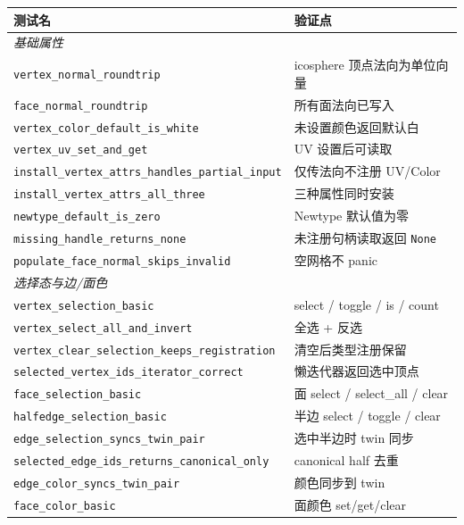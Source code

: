 \documentclass[11pt,a4paper]{article}
\begin{document}
\begin{longtable}{@{}ll@{}}
  \toprule
  \textbf{测试名} & \textbf{验证点} \\
  \midrule
  \endhead
  \multicolumn{2}{l}{\textit{基础属性}} \\
  \texttt{vertex\_normal\_roundtrip}        & icosphere 顶点法向为单位向量 \\
  \texttt{face\_normal\_roundtrip}          & 所有面法向已写入 \\
  \texttt{vertex\_color\_default\_is\_white} & 未设置颜色返回默认白 \\
  \texttt{vertex\_uv\_set\_and\_get}        & UV 设置后可读取 \\
  \texttt{install\_vertex\_attrs\_handles\_partial\_input} & 仅传法向不注册 UV/Color \\
  \texttt{install\_vertex\_attrs\_all\_three} & 三种属性同时安装 \\
  \texttt{newtype\_default\_is\_zero}       & Newtype 默认值为零 \\
  \texttt{missing\_handle\_returns\_none}   & 未注册句柄读取返回 \texttt{None} \\
  \texttt{populate\_face\_normal\_skips\_invalid} & 空网格不 panic \\
  \midrule
  \multicolumn{2}{l}{\textit{选择态与边/面色}} \\
  \texttt{vertex\_selection\_basic}                     & select / toggle / is / count \\
  \texttt{vertex\_select\_all\_and\_invert}             & 全选 + 反选 \\
  \texttt{vertex\_clear\_selection\_keeps\_registration} & 清空后类型注册保留 \\
  \texttt{selected\_vertex\_ids\_iterator\_correct}     & 懒迭代器返回选中顶点 \\
  \texttt{face\_selection\_basic}                      & 面 select / select\_all / clear \\
  \texttt{halfedge\_selection\_basic}                   & 半边 select / toggle / clear \\
  \texttt{edge\_selection\_syncs\_twin\_pair}           & 选中半边时 twin 同步 \\
  \texttt{selected\_edge\_ids\_returns\_canonical\_only} & canonical half 去重 \\
  \texttt{edge\_color\_syncs\_twin\_pair}               & 颜色同步到 twin \\
  \texttt{face\_color\_basic}                           & 面颜色 set/get/clear \\

\end{longtable}
\end{document}
